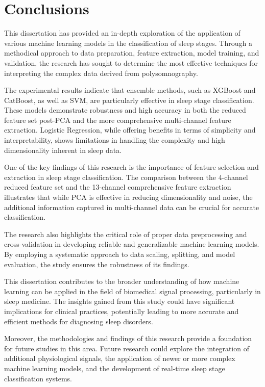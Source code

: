 \documentclass[12pt, a4paper,oneside]{book}
\numberwithin{equation}{section}
\begin{document}
\chapter{Conclusions}\label{ch:concl}
This dissertation has provided an in-depth exploration of the application of various machine learning models in the classification of sleep stages. Through a methodical approach to data preparation, feature extraction, model training, and validation, the research has sought to determine the most effective techniques for interpreting the complex data derived from polysomnography.

The experimental results indicate that ensemble methods, such as XGBoost and CatBoost, as well as SVM, are particularly effective in sleep stage classification. These models demonstrate robustness and high accuracy in both the reduced feature set post-PCA and the more comprehensive multi-channel feature extraction. Logistic Regression, while offering benefits in terms of simplicity and interpretability, shows limitations in handling the complexity and high dimensionality inherent in sleep data.

One of the key findings of this research is the importance of feature selection and extraction in sleep stage classification. The comparison between the 4-channel reduced feature set and the 13-channel comprehensive feature extraction illustrates that while PCA is effective in reducing dimensionality and noise, the additional information captured in multi-channel data can be crucial for accurate classification.

The research also highlights the critical role of proper data preprocessing and cross-validation in developing reliable and generalizable machine learning models. By employing a systematic approach to data scaling, splitting, and model evaluation, the study ensures the robustness of its findings.

This dissertation contributes to the broader understanding of how machine learning can be applied in the field of biomedical signal processing, particularly in sleep medicine. The insights gained from this study could have significant implications for clinical practices, potentially leading to more accurate and efficient methods for diagnosing sleep disorders.

Moreover, the methodologies and findings of this research provide a foundation for future studies in this area. Future research could explore the integration of additional physiological signals, the application of newer or more complex machine learning models, and the development of real-time sleep stage classification systems.
\end{document}
